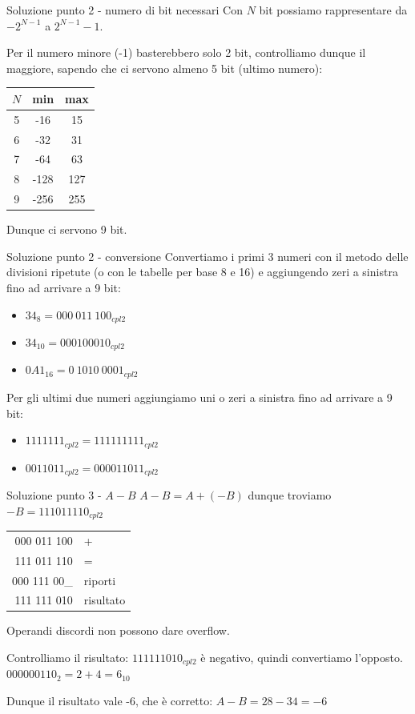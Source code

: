 \documentclass[9pt, format=169]{beamer}
\begin{document}
\begin{frame}{Soluzione punto 2 - numero di bit necessari}
Con $N$ bit possiamo rappresentare da $-2^{N-1}$ a $2^{N-1}-1$.

\pause

Per il numero minore (-1) basterebbero solo 2 bit, controlliamo dunque il maggiore, sapendo che ci servono almeno 5 bit (ultimo numero):

\pause
\begin{center}
\begin{tabular}{ccc}
	$N$	&	min	&	max	\\
	\hline
	5	&	-16	&	15	\\
	6	&	-32	&	31	\\
	7	&	-64	&	63	\\
	8	&	-128&	127	\\
	9	&	-256&	255 \\
\end{tabular}
\end{center}

Dunque ci servono 9 bit.
\end{frame}

\begin{frame}{Soluzione punto 2 - conversione}
Convertiamo i primi 3 numeri con il metodo delle divisioni ripetute (o con le tabelle per base 8 e 16) e aggiungendo zeri a sinistra fino ad arrivare a 9 bit:
	\begin{itemize}
		\item $34_8 = 000\ 011\ 100_{cpl2}$
		\item $34_{10} = 000100010_{cpl2}$
		\item $0A1_{16} = 0\ 1010\ 0001_{cpl2}$
	\end{itemize}

\pause
Per gli ultimi due numeri aggiungiamo uni o zeri a sinistra fino ad arrivare a 9 bit:
	\begin{itemize}
		\item $1111111_{cpl2} = 111111111_{cpl2}$
		\item $0011011_{cpl2} = 000011011_{cpl2}$
 	\end{itemize}
\end{frame}

\begin{frame}{Soluzione punto 3 - $A-B$}
$A-B = A + (-B)$ dunque troviamo $-B = 111011110_{cpl2}$

\pause
\begin{tabular}{r|l}
	000 011 100 & + \\
	111 011 110 & = \\
	\hline
	000 111 00\_&	riporti\\
	111 111 010	& risultato
\end{tabular}

\pause
Operandi discordi non possono dare overflow.

\pause
Controlliamo il risultato: $111111010 _{cpl2}$ è negativo, quindi convertiamo l'opposto.
$000000110_2 = 2+4 = 6_{10}$

Dunque il risultato vale -6, che è corretto: $A-B = 28-34 = -6$

\end{frame}
\end{document}
